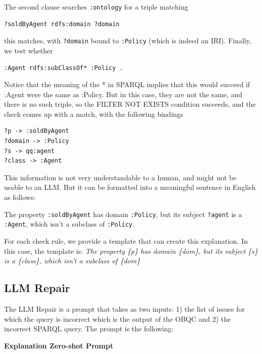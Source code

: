 \documentclass[11pt]{article}
\begin{document}
The second clause searches \texttt{:ontology} for a triple matching

\begin{verbatim}
?soldByAgent rdfs:domain ?domain 
\end{verbatim}

this matches, with \texttt{?domain} bound to \texttt{:Policy} (which is indeed an IRI). 
Finally, we test whether 

\begin{verbatim}
:Agent rdfs:subClassOf* :Policy .
\end{verbatim}

Notice that the meaning of the * in SPARQL implies that this would succeed if :Agent were the same as :Policy.  
But in this case, they are not the same, and there is no such triple, so the FILTER NOT EXISTS condition succeeds, and the check comes up with a match, with the following bindings 

\begin{verbatim}
?p -> :soldByAgent
?domain -> :Policy
?s -> qq:agent
?class -> :Agent
\end{verbatim}

This information is not very understandable to a human, and might not be usable to an LLM.  
But it can be formatted into a meaningful sentence in English as follows: 

The property \texttt{:soldByAgent} has domain \texttt{:Policy}, but its subject \texttt{?agent} is a \texttt{:Agent}, which isn't a subclass of \texttt{:Policy}.

For each check rule, we provide a template that can create this explanation.  In this case, the template is:
\textit{The property \{p\} has domain \{dom\}, but its subject \{s\} is a \{class\}, which isn't a subclass of \{dom\}}



\subsection{LLM Repair}
The LLM Repair is a prompt that takes as two inputs: 1) the list of issues for which the query is incorrect which is the output of the OBQC and 2) the incorrect SPARQL query. 
The prompt is the following:

\noindent\textbf{Explanation Zero-shot Prompt}

\end{document}

